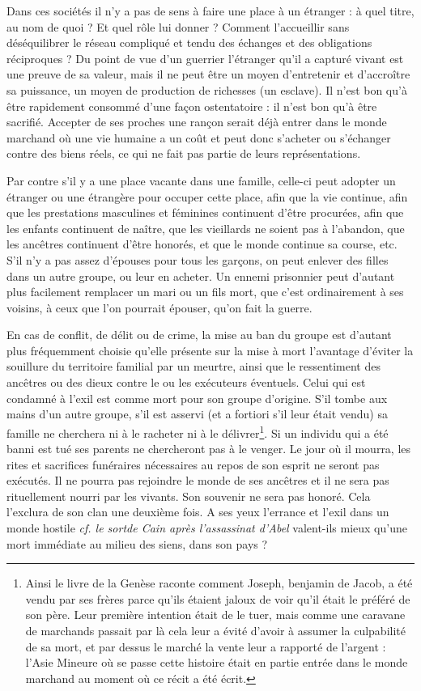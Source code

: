 Dans ces sociétés il n'y a pas de sens à faire une place à un étranger : à quel titre, au nom de quoi ? Et quel rôle lui donner ? Comment l'accueillir sans déséquilibrer le réseau compliqué et tendu des échanges et des obligations réciproques ? Du point de vue d'un guerrier l'étranger qu’il a capturé vivant est une preuve de sa valeur, mais il ne peut être un moyen d'entretenir et d'accroître sa puissance, un moyen de production de richesses (un esclave). Il n'est bon qu'à être rapidement consommé d'une façon ostentatoire : il n'est bon qu'à être sacrifié. Accepter de ses proches une rançon serait déjà entrer dans le monde marchand où une vie humaine a un coût et peut donc s'acheter ou s'échanger contre des biens réels, ce qui ne fait pas partie de leurs représentations.

Par contre s'il y a une place vacante dans une famille, celle-ci peut adopter un étranger ou une étrangère pour occuper cette place, afin que la vie continue, afin que les prestations masculines et féminines continuent d'être procurées, afin que les enfants continuent de naître, que les vieillards ne soient pas à l'abandon, que les ancêtres continuent d'être honorés, et que le monde continue sa course, etc. S'il n'y a pas assez d'épouses pour tous les garçons, on peut enlever des filles dans un autre groupe, ou leur en acheter. Un ennemi prisonnier peut d'autant plus facilement remplacer un mari ou un fils mort, que c'est ordinairement à ses voisins, à ceux que l'on pourrait épouser, qu'on fait la guerre.

En cas de conflit, de délit ou de crime, la mise au ban du groupe est d'autant plus fréquemment choisie qu'elle présente sur la mise à mort l'avantage d'éviter la souillure du territoire familial par un meurtre, ainsi que le ressentiment des ancêtres ou des dieux contre le ou les exécuteurs éventuels. Celui qui est condamné à l'exil est comme mort pour son groupe d'origine. S'il tombe aux mains d'un autre groupe, s'il est asservi (et a fortiori s'il leur était vendu) sa famille ne cherchera ni à le racheter ni à le délivrer\footnote{Ainsi le livre de la Genèse raconte comment Joseph, benjamin de Jacob, a été vendu par ses frères parce qu'ils étaient jaloux de voir qu'il était le préféré de son père. Leur première intention était de le tuer, mais comme une caravane de marchands passait par là cela leur a évité d'avoir à assumer la culpabilité de sa mort, et par dessus le marché la vente leur a rapporté de l'argent : l'Asie Mineure où se passe cette histoire était en partie entrée dans le monde marchand au moment où ce récit a été écrit.}. Si un individu qui a été banni est tué ses parents ne chercheront pas à le venger. Le jour où il mourra, les rites et sacrifices funéraires nécessaires au repos de son esprit ne seront pas exécutés. Il ne pourra pas rejoindre le monde de ses ancêtres et il ne sera pas rituellement nourri par les vivants. Son souvenir ne sera pas honoré. Cela l'exclura de son clan une deuxième fois. A ses yeux l'errance et l'exil dans un monde hostile \emph{cf. le sortde Cain après l'assassinat d'Abel} valent-ils mieux qu'une mort immédiate au milieu des siens, dans son pays ?

